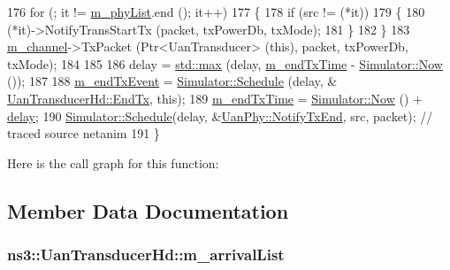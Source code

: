 \begin{DoxyCode}
176   \textcolor{keywordflow}{for} (; it != \hyperlink{classns3_1_1UanTransducerHd_afb3b10ff175e4f315894b9ba13a8c490}{m\_phyList}.end (); it++)
177     \{
178       \textcolor{keywordflow}{if} (src != (*it))
179         \{
180           (*it)->NotifyTransStartTx (packet, txPowerDb, txMode);
181         \}
182     \}
183   \hyperlink{classns3_1_1UanTransducerHd_a6124f374654fef345db73e26d12c0eb1}{m\_channel}->TxPacket (Ptr<UanTransducer> (\textcolor{keyword}{this}), packet, txPowerDb, txMode);
184 
185 
186   delay = \hyperlink{80211b_8c_affe776513b24d84b39af8ab0930fef7f}{std::max} (delay, \hyperlink{classns3_1_1UanTransducerHd_adcf9f31a8fb4054fca32412a13179165}{m\_endTxTime} - \hyperlink{classns3_1_1Simulator_ac3178fa975b419f7875e7105be122800}{Simulator::Now} ());
187 
188   \hyperlink{classns3_1_1UanTransducerHd_ab7bf49e797bf263994d55f1e59c771c0}{m\_endTxEvent} = \hyperlink{classns3_1_1Simulator_a671882c894a08af4a5e91181bf1eec13}{Simulator::Schedule} (delay, &
      \hyperlink{classns3_1_1UanTransducerHd_a0ee7ddf0c21ca8697612045a2b40e84f}{UanTransducerHd::EndTx}, \textcolor{keyword}{this});
189   \hyperlink{classns3_1_1UanTransducerHd_adcf9f31a8fb4054fca32412a13179165}{m\_endTxTime} = \hyperlink{classns3_1_1Simulator_ac3178fa975b419f7875e7105be122800}{Simulator::Now} () + \hyperlink{lte_2model_2fading-traces_2fading__trace__generator_8m_a7964e6aa8f61a9d28973c8267a606ad8}{delay};
190   \hyperlink{classns3_1_1Simulator_a671882c894a08af4a5e91181bf1eec13}{Simulator::Schedule}(delay, &\hyperlink{classns3_1_1UanPhy_a58593421856c9b5fc1bc8fd9356da600}{UanPhy::NotifyTxEnd}, src, packet);    \textcolor{comment}{
      // traced source netanim}
191 \}
\end{DoxyCode}


Here is the call graph for this function\+:




\subsection{Member Data Documentation}
\subsubsection[{\texorpdfstring{m\+\_\+arrival\+List}{m_arrivalList}}]{ ns3\+::\+Uan\+Transducer\+Hd\+::m\+\_\+arrival\+List\hspace{0.3cm}{\ttfamily [private]}}\hypertarget{classns3_1_1UanTransducerHd_a7cddd8b5406534b21219ffd643be33fa}{}\label{classns3_1_1UanTransducerHd_a7cddd8b5406534b21219ffd643be33fa}


